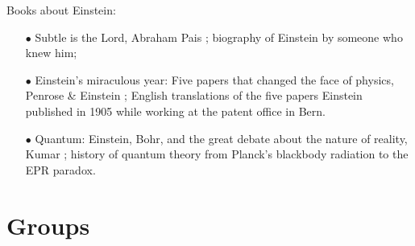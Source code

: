 Books about Einstein: 
\begin{itemize}
\item[$\bullet$] Subtle is the Lord, Abraham Pais \cite{Pais1982}; biography of Einstein by someone who knew him;
\item[$\bullet$] Einstein's miraculous year: Five papers that changed the face of physics, Penrose \& Einstein \cite{Penrose2005Einstein}; English translations of the five papers Einstein published in 1905 while working at the patent office in Bern.  
\item[$\bullet$] Quantum: Einstein, Bohr, and the great debate about the nature of reality, Kumar \cite{Kumar}; history of quantum theory from Planck's blackbody radiation to the EPR paradox.
\end{itemize}

\section{Groups}

